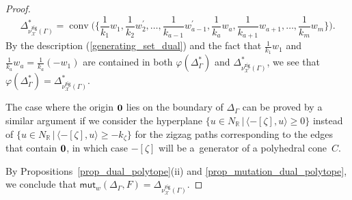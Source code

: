 \documentclass[11pt]{article}
\numberwithin{equation}{section}
\numberwithin{equation}{section}
\numberwithin{figure}{section}
\numberwithin{table}{section}
\newcommand{\RR}{\mathbb{R}}
\newcommand{\calX}{\mathcal{X}}
\newcommand{\zig}{\mathsf{zig}}
\newcommand{\mutation}{\mathsf{mut}}
\begin{document}
\begin{proof}
\begin{displaymath}
\Delta_{\nu^\zig_\calX(\Gamma)}^*=\operatorname{conv}\bigg(\bigg\{\frac{1}{k_1}w_1,\frac{1}{k_2}w_2^\prime,\dots,\frac{1}{k_{a-1}}w_{a-1}^\prime,
\frac{1}{k_a}w_a, \frac{1}{k_{a+1}}w_{a+1}, \dots,\frac{1}{k_m}w_m\bigg\}\bigg).
\end{displaymath}
By the description (\ref{generating_set_dual}) and the fact that $\frac{1}{k_1}w_1$ and $\frac{1}{k_a}w_a=\frac{1}{k_a}(-w_1)$ are contained in both $\varphi(\Delta_\Gamma^*)$ and $\Delta_{\nu^\zig_\calX(\Gamma)}^*$, we see that $\varphi(\Delta_\Gamma^*)=\Delta_{\nu^\zig_\calX(\Gamma)}^*$.

The case where the origin ${\bf 0}$ lies on the boundary of $\Delta_\Gamma$ can be proved by a similar argument if we consider the hyperplane $\{u\in N_\RR\,|\,\langle-[\zeta],u\rangle\ge 0\}$ instead of $\{u\in N_\RR\,|\,\langle-[\zeta],u\rangle\ge -k_\zeta\}$ for the zigzag paths corresponding to the edges that contain ${\bf 0}$, in which case $-[\zeta]$ will be a~generator of a polyhedral cone~$C$.

By Propositions~\ref{prop_dual_polytope}(ii) and \ref{prop_mutation_dual_polytope}, we conclude that
$\mutation_{w}(\Delta_\Gamma,F)=\Delta_{\nu^\zig_\calX(\Gamma)}$.
\end{proof}
\end{document}
